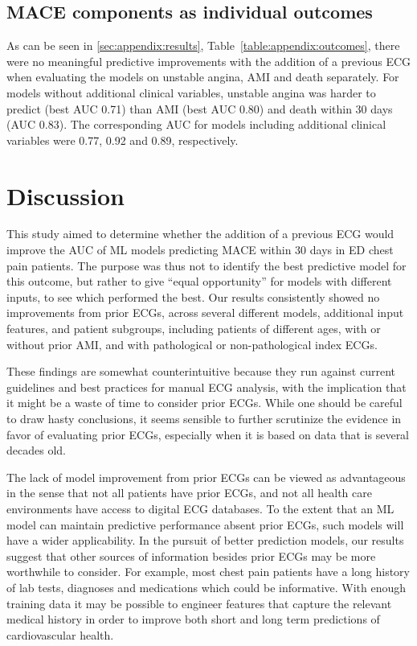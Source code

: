 \documentclass[preprint]{elsarticle}
\begin{document}
\subsection{MACE components as individual outcomes}
As can be seen in \ref{sec:appendix:results}, Table~\ref{table:appendix:outcomes}, there were no meaningful predictive improvements with the addition of a previous ECG when evaluating the models on unstable angina, AMI and death separately. For models without additional clinical variables, unstable angina was harder to predict (best AUC 0.71) than AMI (best AUC 0.80) and death within 30 days (AUC 0.83). The corresponding AUC for models including additional clinical variables were 0.77, 0.92 and 0.89, respectively. 

\section{Discussion}
This study aimed to determine whether the addition of a previous ECG would improve the AUC of ML models predicting MACE within 30 days in ED chest pain patients. The purpose was thus not to identify the best predictive model for this outcome, but rather to give ``equal opportunity'' for models with different inputs, to see which performed the best. Our results consistently showed no improvements from prior ECGs, across several different models, additional input features, and patient subgroups, including patients of different ages, with or without prior AMI, and with pathological or non-pathological index ECGs.

These findings are somewhat counterintuitive because they run against current guidelines and best practices for manual ECG analysis, with the implication that it might be a waste of time to consider prior ECGs. While one should be careful to draw hasty conclusions, it seems sensible to further scrutinize the evidence in favor of evaluating prior ECGs, especially when it is based on data that is several decades old.

The lack of model improvement from prior ECGs can be viewed as advantageous in the sense that not all patients have prior ECGs, and not all health care environments have access to digital ECG databases. To the extent that an ML model can maintain predictive performance absent prior ECGs, such models will have a wider applicability. In the pursuit of better prediction models, our results suggest that other sources of information besides prior ECGs may be more worthwhile to consider. For example, most chest pain patients have a long history of lab tests, diagnoses and medications which could be informative. With enough training data it may be possible to engineer features that capture the relevant medical history in order to improve both short and long term predictions of cardiovascular health. 
\end{document}
